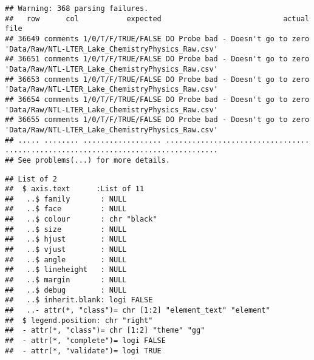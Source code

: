 \documentclass[]{article}
\newenvironment{Shaded}{\begin{snugshade}}{\end{snugshade}}
\newcommand{\KeywordTok}[1]{\textcolor[rgb]{0.13,0.29,0.53}{\textbf{#1}}}
\newcommand{\DataTypeTok}[1]{\textcolor[rgb]{0.13,0.29,0.53}{#1}}
\newcommand{\DecValTok}[1]{\textcolor[rgb]{0.00,0.00,0.81}{#1}}
\newcommand{\StringTok}[1]{\textcolor[rgb]{0.31,0.60,0.02}{#1}}
\newcommand{\CommentTok}[1]{\textcolor[rgb]{0.56,0.35,0.01}{\textit{#1}}}
\newcommand{\NormalTok}[1]{#1}
\begin{document}
\begin{verbatim}
## Warning: 368 parsing failures.
##   row      col           expected                            actual                                              file
## 36649 comments 1/0/T/F/TRUE/FALSE DO Probe bad - Doesn't go to zero 'Data/Raw/NTL-LTER_Lake_ChemistryPhysics_Raw.csv'
## 36651 comments 1/0/T/F/TRUE/FALSE DO Probe bad - Doesn't go to zero 'Data/Raw/NTL-LTER_Lake_ChemistryPhysics_Raw.csv'
## 36653 comments 1/0/T/F/TRUE/FALSE DO Probe bad - Doesn't go to zero 'Data/Raw/NTL-LTER_Lake_ChemistryPhysics_Raw.csv'
## 36654 comments 1/0/T/F/TRUE/FALSE DO Probe bad - Doesn't go to zero 'Data/Raw/NTL-LTER_Lake_ChemistryPhysics_Raw.csv'
## 36655 comments 1/0/T/F/TRUE/FALSE DO Probe bad - Doesn't go to zero 'Data/Raw/NTL-LTER_Lake_ChemistryPhysics_Raw.csv'
## ..... ........ .................. ................................. .................................................
## See problems(...) for more details.
\end{verbatim}

\begin{Shaded}
\end{Shaded}

\begin{verbatim}
## List of 2
##  $ axis.text      :List of 11
##   ..$ family       : NULL
##   ..$ face         : NULL
##   ..$ colour       : chr "black"
##   ..$ size         : NULL
##   ..$ hjust        : NULL
##   ..$ vjust        : NULL
##   ..$ angle        : NULL
##   ..$ lineheight   : NULL
##   ..$ margin       : NULL
##   ..$ debug        : NULL
##   ..$ inherit.blank: logi FALSE
##   ..- attr(*, "class")= chr [1:2] "element_text" "element"
##  $ legend.position: chr "right"
##  - attr(*, "class")= chr [1:2] "theme" "gg"
##  - attr(*, "complete")= logi FALSE
##  - attr(*, "validate")= logi TRUE
\end{verbatim}
\end{document}
